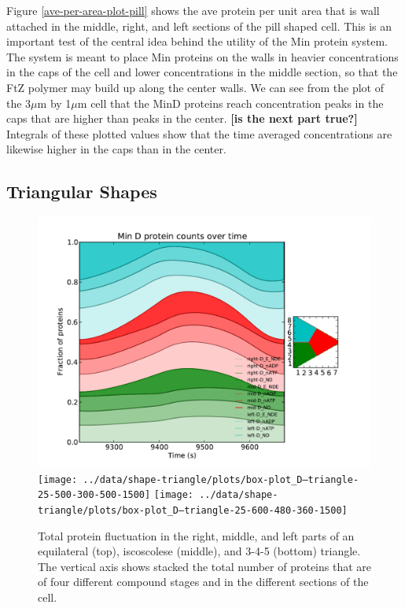 \documentclass[letterpaper,twocolumn,amsmath,amssymb,pre]{revtex4-1}
\newcommand{\red}[1]{{\bf \color{red} #1}}
\newcommand{\fixme}[1]{\red{[#1]}}
\newcommand\micron{\ensuremath{\mu\text{m}}}
\begin{document}
Figure \ref{ave-per-area-plot-pill} shows the ave protein per unit
area that is wall attached in the middle, right, and left sections of
the pill shaped cell.  This is an important test of the central idea
behind the utility of the Min protein system.  The system is meant to
place Min proteins on the walls in heavier concentrations in the caps
of the cell and lower concentrations in the middle section, so that
the FtZ polymer may build up along the center walls.  We can see from
the plot of the 3$\micron$ by 1$\micron$ cell that the MinD proteins reach
concentration peaks in the caps that are higher than peaks in the
center.  \fixme{is the next part true?} Integrals of these plotted values show that the time averaged
concentrations are likewise higher in the caps than in the center.

\subsection{Triangular Shapes}
\begin{figure}
  \includegraphics[width=\columnwidth]{../data/shape-triangle/plots/box-plot_D--triangle-25-400-400-400-1500}
  \texttt{[image: ../data/shape-triangle/plots/box-plot\_D--triangle-25-500-300-500-1500]}
  \texttt{[image: ../data/shape-triangle/plots/box-plot\_D--triangle-25-600-480-360-1500]}
  \caption{Total protein fluctuation in the right, middle, and left
    parts of an equilateral (top), iscoscolese (middle), and 3-4-5
    (bottom) triangle.  The vertical axis shows stacked the total
    number of proteins that are of four different compound stages and
    in the different sections of the cell.}
  \label{box-triangle}
\end{figure}
\end{document}

